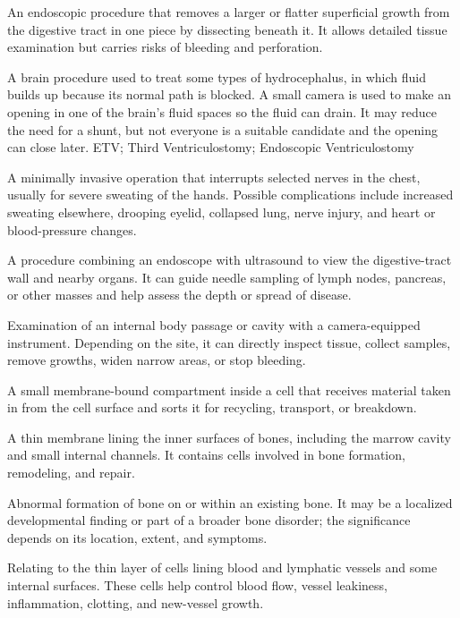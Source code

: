  An endoscopic procedure that removes a larger or flatter superficial growth from the digestive tract in one piece by dissecting beneath it. It allows detailed tissue examination but carries risks of bleeding and perforation.

 A brain procedure used to treat some types of hydrocephalus, in which fluid builds up because its normal path is blocked. A small camera is used to make an opening in one of the brain's fluid spaces so the fluid can drain. It may reduce the need for a shunt, but not everyone is a suitable candidate and the opening can close later.
\synonyms
ETV; Third Ventriculostomy; Endoscopic Ventriculostomy

 A minimally invasive operation that interrupts selected nerves in the chest, usually for severe sweating of the hands. Possible complications include increased sweating elsewhere, drooping eyelid, collapsed lung, nerve injury, and heart or blood-pressure changes.

 A procedure combining an endoscope with ultrasound to view the digestive-tract wall and nearby organs. It can guide needle sampling of lymph nodes, pancreas, or other masses and help assess the depth or spread of disease.

 Examination of an internal body passage or cavity with a camera-equipped instrument. Depending on the site, it can directly inspect tissue, collect samples, remove growths, widen narrow areas, or stop bleeding.

 A small membrane-bound compartment inside a cell that receives material taken in from the cell surface and sorts it for recycling, transport, or breakdown.

 A thin membrane lining the inner surfaces of bones, including the marrow cavity and small internal channels. It contains cells involved in bone formation, remodeling, and repair.

 Abnormal formation of bone on or within an existing bone. It may be a localized developmental finding or part of a broader bone disorder; the significance depends on its location, extent, and symptoms.

 Relating to the thin layer of cells lining blood and lymphatic vessels and some internal surfaces. These cells help control blood flow, vessel leakiness, inflammation, clotting, and new-vessel growth.

